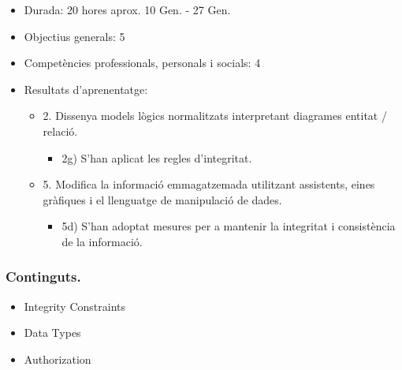 \documentclass[catalan, a4paper, 12pt, titlepage]{article}
\begin{document}
  \begin{itemize}
	\item Durada: 20 hores aprox. 10 Gen. - 27 Gen.
	\item Objectius generals: 5
	\item Competències professionals, personals i socials: 4
	\item Resultats d'aprenentatge: 
		\begin{itemize}
			\item 2. Dissenya models lògics normalitzats interpretant diagrames entitat / relació.
				\begin{itemize}
					\item 2g) S'han aplicat les regles d'integritat.
				\end{itemize}
			\item 5. Modifica la informació emmagatzemada utilitzant assistents, eines gràfiques i el llenguatge de manipulació de dades.
				\begin{itemize}
					\item 5d) S'han adoptat mesures per a mantenir la integritat i consistència de la informació.
				\end{itemize}
		\end{itemize}
  \end{itemize}
  
  \subsubsection{Continguts.}
  \begin{itemize}
	  \item Integrity Constraints
	  \item Data Types
	  \item Authorization
  \end{itemize}
\end{document}
